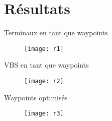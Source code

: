 \section{Résultats}


\begin{frame}{Terminaux en tant que waypoints}
\begin{figure}
	\centering
	\texttt{[image: r1]}
	\label{fig:r1}
\end{figure}

\end{frame}

\begin{frame}{VBS en tant que waypoints}
\begin{figure}
	\centering
	\texttt{[image: r2]}
	\label{fig:r1}
\end{figure}

\end{frame}

\begin{frame}{Waypoints optimisés}
\begin{figure}
	\centering
	\texttt{[image: r3]}
	\label{fig:r1}
\end{figure}

\end{frame}


